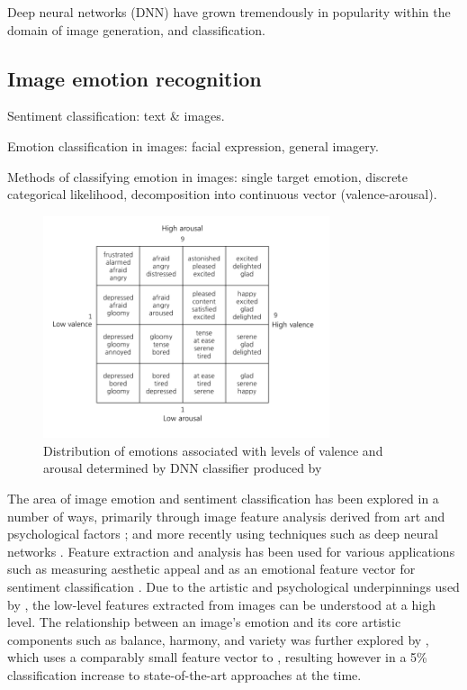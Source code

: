 \documentclass{article}
\begin{document}
Deep neural networks (DNN) have grown tremendously in popularity within the domain of image generation, and classification.

	
\subsection{Image emotion recognition}
\begin{todolist}
	\item Sentiment classification: text \& images.
	\item Emotion classification in images: facial expression, general imagery.
	\item Methods of classifying emotion in images: single target emotion, discrete categorical likelihood, decomposition into continuous vector (valence-arousal).
\end{todolist}
	
\begin{figure}[h!]
	\includegraphics[width=0.75\textwidth]{images/valence-arousal-grid.png}
	\caption{Distribution of emotions associated with levels of valence and arousal determined by DNN classifier produced by \citet{kim2018building}}
	\label{fig:valence-arousal}
\end{figure}

The area of image emotion and sentiment classification has been explored in a number of ways, primarily through image feature analysis derived from art and psychological factors \citep{machajdik2010affective}; and more recently using techniques such as deep neural networks \citep{chen2015learning, kim2018building}.
Feature extraction and analysis has been used for various applications such as measuring aesthetic appeal \citep{den2010using,den2010comparing,den2011evolving} and as an emotional feature vector for sentiment classification \citep{machajdik2010affective}.
Due to the artistic and psychological underpinnings used by \citet{machajdik2010affective}, the low-level features extracted from images can be understood at a high level.
The relationship between an image's emotion and its core artistic components such as balance, harmony, and variety was further explored by \citet{zhao2014exploring}, which uses a comparably small feature vector to \citet{machajdik2010affective}, resulting however in a 5\% classification increase to state-of-the-art approaches at the time.
\end{document}
